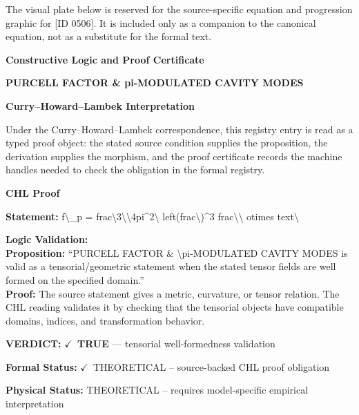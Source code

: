 \begingroup\footnotesize\sloppy
The visual plate below is reserved for the source-specific equation and progression graphic for [ID 0506]. It is included only as a companion to the canonical equation, not as a substitute for the formal text.
\par\endgroup
\ifTZPDarkEdition
{}
\fi

\clearpage
\begingroup\tzpsupportsetup
\noindent\textbf{\fontsize{10.8pt}{12.8pt}\selectfont [ID 0506] Constructive Logic and Proof Certificate}\par
\noindent\textbf{\fontsize{10pt}{12pt}\selectfont PURCELL FACTOR \& pi-MODULATED CAVITY MODES}\par
\vspace{0.45em}
\begingroup
\footnotesize
\setlength{\parskip}{0.22em}
\setlength{\parindent}{0pt}
\noindent\textbf{Curry--Howard--Lambek Interpretation}\par
Under the Curry--Howard--Lambek correspondence, this registry entry is read as a typed proof
object: the stated source condition supplies the proposition, the derivation supplies the
morphism, and the proof certificate records the machine handles needed to check the obligation
in the formal registry.

\vspace{0.45em}
\noindent\textbf{CHL Proof}\par
\textbf{Statement:} f\textbackslash{}\_p = frac\textbackslash{}3\textbackslash{}\textbackslash{}4pi\textasciicircum{}2\textbackslash{} left(frac\textbackslash{})\textasciicircum{}3 frac\textbackslash{}\textbackslash{} otimes text\textbackslash{}

\textbf{Logic Validation:}\\
\textbf{Proposition:} ``PURCELL FACTOR \& \textbackslash{}pi-MODULATED CAVITY MODES is valid as a tensorial/geometric
statement when the stated tensor fields are well formed on the specified domain.''\\
\textbf{Proof:} The source statement gives a metric, curvature, or tensor relation. The CHL reading
validates it by checking that the tensorial objects have compatible domains, indices,
and transformation behavior.

\textbf{VERDICT:} \ensuremath{\checkmark}\ \textbf{TRUE} --- tensorial well-formedness validation

\textbf{Formal Status:} \ensuremath{\checkmark}\ THEORETICAL -- source-backed CHL proof obligation

\textbf{Physical Status:} THEORETICAL -- requires model-specific empirical interpretation
\par\vspace{0.45em}
\par
\ifTZPDarkEdition
{}
\fi
\endgroup
\endgroup
